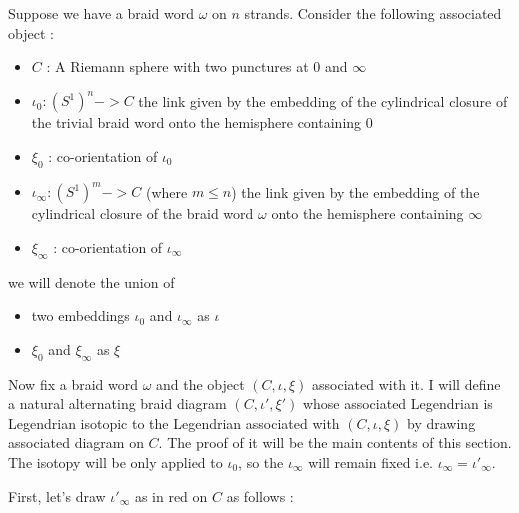 Suppose we have a braid word $\omega$ on $n$ strands. 
Consider the following associated object : 
\begin{itemize}
\item $C$ : 
A Riemann sphere with two punctures at $0$ and $\infty$

\item $\iota_0 : (S^1)^n->  C$
the link given by the embedding of the cylindrical closure of the trivial braid word onto the hemisphere containing $0$

\item $\xi_0$ : co-orientation of $\iota_0$

\item $\iota_\infty : (S^1)^m->  C$ (where $m \leq n$)
the link given by the embedding of the cylindrical closure of the braid word $\omega$ onto the hemisphere containing $\infty$

\item $\xi_\infty$ : co-orientation of $\iota_\infty$
\end{itemize}



we will denote the union of 
\begin{itemize}
\item two embeddings $\iota_0$ and $\iota_\infty$ as $\iota$ 
\item $\xi_0$ and $\xi_\infty$ as $\xi$
\end{itemize}

Now fix a braid word $\omega$ and the object $(C,\iota,\xi)$ associated with it. I will define a natural alternating braid diagram $(C,\iota',\xi')$ whose associated Legendrian is Legendrian isotopic to the Legendrian associated with $(C,\iota,\xi)$ by drawing associated diagram on $C$. The proof of it will be the main contents of this section. The isotopy will be only applied to $\iota_0$, so the $\iota_\infty$ will remain fixed i.e. $\iota_\infty = \iota'_\infty$.

First, let's draw $\iota'_\infty$ as in red on $C$ as follows :

